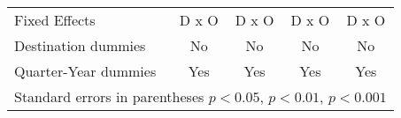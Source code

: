 \begin{table}[htbp]
\begin{tabular}{l*{4}{c}}
Fixed Effects       &       D x O         &       D x O         &       D x O         &       D x O         \\
Destination dummies &          No         &          No         &          No         &          No         \\
Quarter-Year dummies&         Yes         &         Yes         &         Yes         &         Yes         \\
\hline\hline
\multicolumn{5}{l}{Standard errors in parentheses \sym{*} \(p<0.05\), \sym{**} \(p<0.01\), \sym{***} \(p<0.001\)}\\
\end{tabular}
\end{table}
